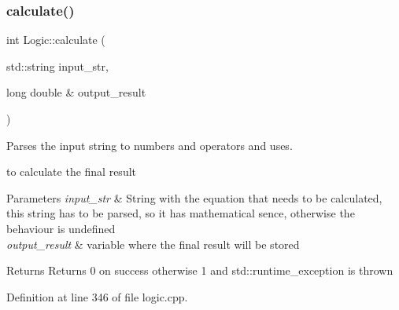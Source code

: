 \mbox{\label{class_logic_acd1683cf5265bacac5e0710ddb123e03}} 
\subsubsection{\texorpdfstring{calculate()}{calculate()}\hspace{0.1cm}{\footnotesize\ttfamily [2/2]}}
{\footnotesize\ttfamily int Logic\+::calculate (\begin{DoxyParamCaption}\item[{std\+::string}]{input\+\_\+str,  }\item[{long double \&}]{output\+\_\+result }\end{DoxyParamCaption})\hspace{0.3cm}{\ttfamily [related]}}



Parses the input string to numbers and operators and uses. 

to calculate the final result 
\begin{DoxyParams}{Parameters}
{\em input\+\_\+str} & String with the equation that needs to be calculated, this string has to be parsed, so it has mathematical sence, otherwise the behaviour is undefined \\
\hline
{\em output\+\_\+result} & variable where the final result will be stored \\
\hline
\end{DoxyParams}
\begin{DoxyReturn}{Returns}
Returns 0 on success otherwise 1 and std\+::runtime\+\_\+exception is thrown 
\end{DoxyReturn}


Definition at line 346 of file logic.\+cpp.


